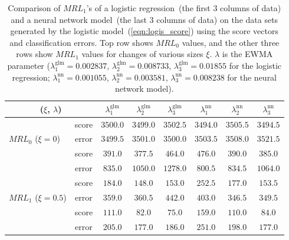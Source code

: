 \documentclass[twoside,11pt]{article}
\begin{document}
\begin{appendices}
\begin{table}[H]
\centering
\begin{tabular}{lc|ccc|ccc}
\toprule
\multicolumn{2}{c|}{($ \xi$, $ \lambda$)} & {$  \lambda_1^{\text{glm}}$} & {$ \lambda_2^{\text{glm}}$} & {$ \lambda_3^{\text{glm}}$} & {$  \lambda_1^{\text{nn}}$} & {$ \lambda_2^{\text{nn}}$} & {$ \lambda_3^{\text{nn}}$} \\
\toprule
\multirow{3}{*}{$MRL_0$ ($\xi = 0$)} & score &$3500.0$ & $3499.0$ & $3502.5$ &$3494.0$ & $3505.5$ & $3494.5$\\
& error &$3499.5$ & $3501.0$ & $3500.0$ &$3503.5$ & $3508.0$ & $3521.5$ \\
\midrule
\midrule
\multirow{3}{*}{$MRL_1$ ($\xi = 0.3$)} & score &$\bm{391.0}$ & $\bm{377.5}$ & $\bm{464.0}$ &$\bm{476.0}$ & $\bm{390.0}$ & $\bm{385.0}$\\
& error &$835.0$ & $1050.0$ & $1278.0$ &$800.5$ & $834.5$ & $1064.0$ \\
\midrule
\multirow{3}{*}{$MRL_1$ ($\xi = 0.5$)} & score &$\bm{184.0}$ & $\bm{148.0}$ & $\bm{153.0}$ &$\bm{252.5}$ & $\bm{177.0}$ & $\bm{153.5}$ \\
& error &$359.0$ & $360.5$ & $442.0$ &$403.0$ & $346.5$ & $349.5$ \\
\midrule
\multirow{3}{*}{$MRL_1$ ($\xi = 0.7$)} & score &$\bm{111.0}$ & $\bm{82.0}$ & $\bm{75.0}$ &$\bm{159.0}$ & $\bm{110.0}$ & $\bm{84.0}$\\
& error &$205.0$ & $177.0$ & $186.0$ &$251.0$ & $198.0$ & $177.0$ \\
\midrule
\end{tabular}
\caption{Comparison of $MRL_1$'s of a logistic regression~(the first $3$ columns of data) and a neural network model~(the last $3$ columns of data) on the data sets generated by the logistic model~(\ref{eqn:logis_score}) using the score vectors and classification errors. Top row shows $MRL_0$ values, and the other three rows show $MRL_1$ values for changes of various sizes $\xi$. $ \lambda$ is the EWMA parameter ({$ \lambda_1^{\text{glm}} = 0.002837$}, {$ \lambda_2^{\text{glm}} = 0.008733$}, {$ \lambda_3^{\text{glm}} = 0.01855$} for the logistic regression; {$ \lambda_1^{\text{nn}}=0.001055$}, {$ \lambda_2^{\text{nn}}=0.003581$}, {$ \lambda_3^{\text{nn}}=0.008238$} for the neural network model).}
\label{tab:logi_MRL}
\end{table}


\end{appendices}
\end{document}
